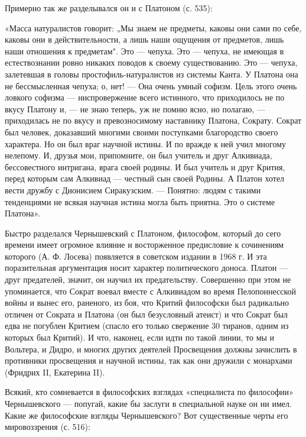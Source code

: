 Примерно так же разделывался он и с Платоном (с. 535):

«Масса  натуралистов  говорит:  „Мы  знаем  не  предметы,  каковы  они
сами  по себе,  каковы они  в действительности,  а лишь  наши ощущения
от  предметов,  лишь наши  отношения  к  предметам". Это  ---  чепуха.
Это   ---  чепуха,   не   имеющая  в   естествознании  ровно   никаких
поводов  к   своему  существованию.  Это  ---   чепуха,  залетевшая  в
головы  простофиль-натуралистов из  системы  Канта. У  Платона она  не
бессмысленная  чепуха;  о,  нет!  --- Она  очень  умный  софизм.  Цель
этого очень  ловкого софизма  --- ниспровержение всего  истинного, что
приходилось не  по вкусу Платону  и, --- не  знаю теперь, уж  не помню
ясно,  но  полагаю,  ---  приходилась не  по  вкусу  и  превозносимому
наставнику Платона,  Сократу. Сократ  был человек,  доказавший многими
своими  поступками  благородство  своего  характера. Но  он  был  враг
научной истины.  И по вражде  к ней  учил многому нелепому.  И, друзья
мои,  припомните,  он  был  учитель и  друг  Алкивиада,  бессовестного
интригана,  врага своей  родины. И  был учитель  и друг  Крития, перед
которым  сам Алкивиад  --- честный  сын своей  Родины. А  Платон хотел
вести  дружбу с  Дионисием Сиракузским.  --- Понятно:  людям с  такими
тенденциями не всякая научная истина могла быть приятна. Это о системе
Платона».

Быстро разделался Чернышевский с  Платоном, философом, который до сего
времени имеет огромное влияние и восторженное предисловие к сочинениям
которого (А. Ф. Лосева) появляется в советском издании в 1968 г. И эта
поразительная аргументация носит характер политического доноса. Платон
--- друг  предателей, значит,  он научил их  предательству. Совершенно
при  этом не  упоминается, что  Сократ воевал  вместе с  Алкивиадом во
время Пелопоннесской войны  и вынес его, раненого, из  боя, что Критий
философски  был  радикально  отличен  от Сократа  и  Платона  (он  был
безусловный атеист) и что Сократ  был едва не погублен Критием (спасло
его только свержение 30 тиранов, одним  из которых был Критий). И что,
наконец, если идти по такой линии, то мы и Вольтера, и Дидро, и многих
других деятелей Просвещения должны  зачислить в противники просвещения
и  научной  истины, так  как  они  дружили  с монархами  (Фридрих  II,
Екатерина II).

Всякий,  кто  сомневается  в   философских  взглядах  «специалиста  по
философии» Чернышевского  --- попугай, какие бы  заслуги в специальной
науке  он ни  имел. Какие  же философские  взгляды Чернышевского?  Вот
существенные черты его мировоззрения (с. 516):


